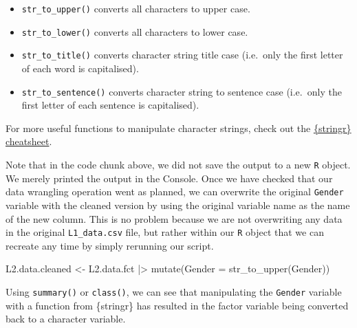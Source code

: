 \documentclass[
  letterpaper,
  DIV=11,
  numbers=noendperiod]{scrreprt}
\newenvironment{Shaded}{\begin{snugshade}}{\end{snugshade}}
\newcommand{\AttributeTok}[1]{\textcolor[rgb]{0.40,0.45,0.13}{#1}}
\newcommand{\FunctionTok}[1]{\textcolor[rgb]{0.28,0.35,0.67}{#1}}
\newcommand{\NormalTok}[1]{\textcolor[rgb]{0.00,0.23,0.31}{#1}}
\newcommand{\OtherTok}[1]{\textcolor[rgb]{0.00,0.23,0.31}{#1}}
\newcommand{\SpecialCharTok}[1]{\textcolor[rgb]{0.37,0.37,0.37}{#1}}
\providecommand{\tightlist}{%
  \setlength{\itemsep}{0pt}\setlength{\parskip}{0pt}}
\begin{document}
\begin{itemize}
\tightlist
\item
  \texttt{str\_to\_upper()} converts all characters to upper case.
\item
  \texttt{str\_to\_lower()} converts all characters to lower case.
\item
  \texttt{str\_to\_title()} converts character string title case
  (i.e.~only the first letter of each word is capitalised).
\item
  \texttt{str\_to\_sentence()} converts character string to sentence
  case (i.e.~only the first letter of each sentence is capitalised).
\end{itemize}

For more useful functions to manipulate character strings, check out the
\href{https://github.com/rstudio/cheatsheets/blob/main/strings.pdf}{\{stringr\}
cheatsheet}.

Note that in the code chunk above, we did not save the output to a new
\texttt{R} object. We merely printed the output in the Console. Once we
have checked that our data wrangling operation went as planned, we can
overwrite the original \texttt{Gender} variable with the cleaned version
by using the original variable name as the name of the new column. This
is no problem because we are not overwriting any data in the original
\texttt{L1\_data.csv} file, but rather within our \texttt{R} object that
we can recreate any time by simply rerunning our script.

\begin{Shaded}
\begin{Highlighting}[]
\NormalTok{L2.data.cleaned }\OtherTok{\textless{}{-}}\NormalTok{ L2.data.fct }\SpecialCharTok{|\textgreater{}} 
  \FunctionTok{mutate}\NormalTok{(}\AttributeTok{Gender =} \FunctionTok{str\_to\_upper}\NormalTok{(Gender))}
\end{Highlighting}
\end{Shaded}

Using \texttt{summary()} or \texttt{class()}, we can see that
manipulating the \texttt{Gender} variable with a function from
\{stringr\} has resulted in the factor variable being converted back to
a character variable.

\begin{Shaded}
\end{Shaded}
\end{document}
